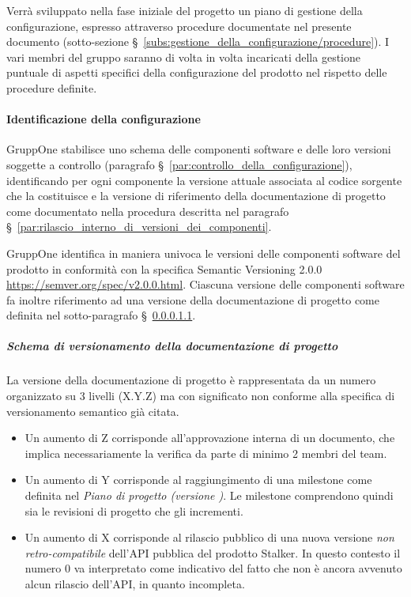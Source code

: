 \documentclass[../../norme-di-progetto.tex]{subfiles}
\begin{document}
Verrà sviluppato nella fase iniziale del progetto un piano di gestione della configurazione, espresso attraverso procedure documentate nel presente documento (sotto-sezione §~\ref{subs:gestione_della_configurazione/procedure}).
I vari membri del gruppo saranno di volta in volta incaricati della gestione puntuale di aspetti specifici della configurazione del prodotto nel rispetto delle procedure definite.


\paragraph{Identificazione della configurazione}%
\label{par:identificazione_della_configurazione}

GruppOne stabilisce uno schema delle componenti software e delle loro versioni soggette a controllo (paragrafo §~\ref{par:controllo_della_configurazione}), identificando per ogni componente la versione attuale associata al codice sorgente che la costituisce e la versione di riferimento della documentazione di progetto come documentato nella procedura descritta nel paragrafo §~\ref{par:rilascio_interno_di_versioni_dei_componenti}.

GruppOne identifica in maniera univoca le versioni delle componenti software del prodotto in conformità con la specifica Semantic Versioning 2.0.0 \href{https://semver.org/spec/v2.0.0.html}{https://semver.org/spec/v2.0.0.html}.
Ciascuna versione delle componenti software fa inoltre riferimento ad una versione della documentazione di progetto come definita nel sotto-paragrafo §~\ref{subp:schema_di_versionamento_della_documentazione_di_progetto}.

\subparagraph{Schema di versionamento della documentazione di progetto}%
\label{subp:schema_di_versionamento_della_documentazione_di_progetto}

La versione della documentazione di progetto è rappresentata da un numero organizzato su 3 livelli (X.Y.Z) ma con significato non conforme alla specifica di versionamento semantico già citata.

\begin{itemize}
  \item Un aumento di Z corrisponde all'approvazione interna di un documento, che implica necessariamente la verifica da parte di minimo 2 membri del team.
  \item Un aumento di Y corrisponde al raggiungimento di una milestone come definita nel \textit{Piano di progetto (versione \versione)}. Le milestone comprendono quindi sia le revisioni di progetto che gli incrementi.
  \item Un aumento di X corrisponde al rilascio pubblico di una nuova versione \textit{non retro-compatibile} dell'API pubblica del prodotto Stalker. In questo contesto il numero 0 va interpretato come indicativo del fatto che non è ancora avvenuto alcun rilascio dell'API, in quanto incompleta.
\end{itemize}
\end{document}
